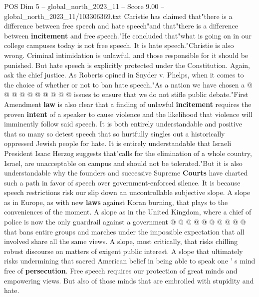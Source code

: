 \begin{textsample}{POS Dim 5 – global\_north\_2023\_11 – Score 9.00 – global\_north\_2023\_11/103306369.txt}
Christie has claimed that"there is a difference between free speech and hate speech"and that"there is a difference between \textbf{incitement} and free speech."He concluded that"what is going on in our college campuses today is not free speech.
It is hate speech."Christie is also wrong.
Criminal intimidation is unlawful, and those responsible for it should be punished.
But hate speech is explicitly protected under the Constitution.
Again, ask the chief justice.
As Roberts opined in Snyder v.
Phelps, when it comes to the choice of whether or not to ban hate speech,"As a nation we have chosen a @ @ @ @ @ @ @ @ @ @ issues to ensure that we do not stifle public debate."First Amendment \textbf{law} is also clear that a finding of unlawful \textbf{incitement} requires the proven \textbf{intent} of a speaker to cause violence and the likelihood that violence will imminently follow said speech.
It is both entirely understandable and positive that so many so detest speech that so hurtfully singles out a historically oppressed Jewish people for hate.
It is entirely understandable that Israeli President Isaac Herzog suggests that"calls for the elimination of a whole country, Israel, are unacceptable on campus and should not be tolerated."But it is also understandable why the founders and successive Supreme \textbf{Courts} have charted such a path in favor of speech over government-enforced silence.
It is because speech restrictions risk our slip down an uncontrollable subjective slope.
A slope as in Europe, as with new \textbf{laws} against Koran burning, that plays to the conveniences of the moment.
A slope as in the United Kingdom, where a chief of police is now the only guardrail against a government @ @ @ @ @ @ @ @ @ @ that bans entire groups and marches under the impossible expectation that all involved share all the same views.
A slope, most critically, that risks chilling robust discourse on matters of exigent public interest.
A slope that ultimately risks undermining that sacred American belief in being able to speak one ' s mind free of \textbf{persecution}.
Free speech requires our protection of great minds and empowering views.
But also of those minds that are embroiled with stupidity and hate.

\end{textsample}
